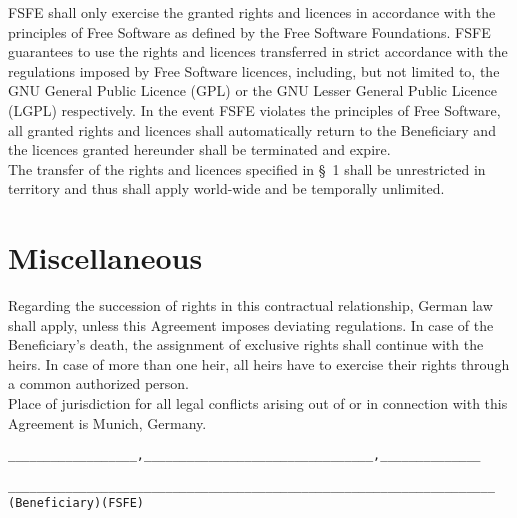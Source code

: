 \A FSFE shall only exercise the granted rights and licences in
accordance with the principles of Free Software as defined by 
the Free Software Foundations. FSFE guarantees to use the rights 
and licences transferred in strict accordance with the
regulations imposed by Free Software licences, including, but not
limited to, the GNU General Public Licence (GPL) or the GNU Lesser
General Public Licence (LGPL) respectively. In the event FSFE violates
the principles of Free Software, all granted rights and licences shall
automatically return to the Beneficiary and the licences granted
hereunder shall be terminated and expire.\\

\A The transfer of the rights and licences specified in {\S}~1 shall
be unrestricted in territory and thus shall apply world-wide and be
temporally unlimited.

\section{Miscellaneous}
\A Regarding the succession of rights in this contractual
relationship, German law shall apply, unless this Agreement imposes
deviating regulations. In case of the Beneficiary's death, the
assignment of exclusive rights shall continue with the heirs. In case
of more than one heir, all heirs have to exercise their rights through
a common authorized person.\\

\A Place of jurisdiction for all legal conflicts arising out of or in
connection with this Agreement is Munich, Germany.\\

\enlargethispage{2cm}
\vspace{3cm}
\begin{alltt}
__________________, ______________    __________________, ______________




__________________________________    __________________________________
           (Beneficiary)                         (FSFE)
\end{alltt}


